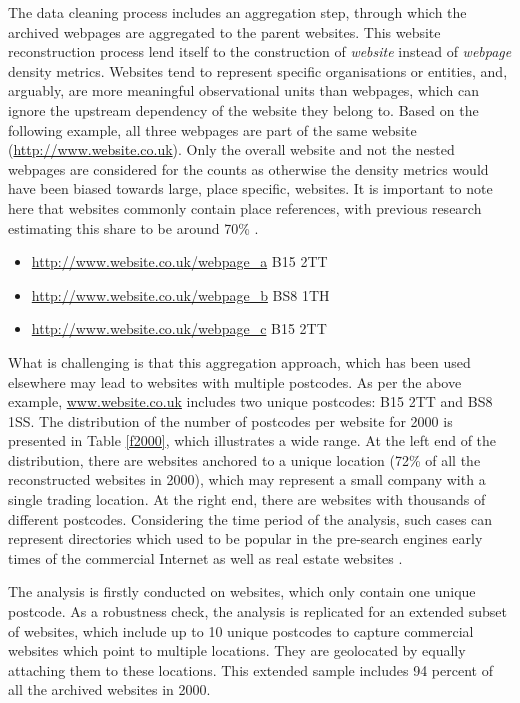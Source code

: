 \documentclass[
  authoryear,
  preprint,
  3p]{elsarticle}
\begin{document}
The data cleaning process includes an aggregation step, through which
the archived webpages are aggregated to the parent websites. This
website reconstruction process lend itself to the construction of
\emph{website} instead of \emph{webpage} density metrics. Websites tend
to represent specific organisations or entities, and, arguably, are more
meaningful observational units than webpages, which can ignore the
upstream dependency of the website they belong to. Based on the
following example, all three webpages are part of the same website
(\url{http://www.website.co.uk}). Only the overall website and not the
nested webpages are considered for the counts as otherwise the density
metrics would have been biased towards large, place specific, websites.
It is important to note here that websites commonly contain place
references, with previous research estimating this share to be around
70\% \citep{hill2009georeferencing}.

\begin{itemize}
\item
  \url{http://www.website.co.uk/webpage_a} B15 2TT
\item
  \url{http://www.website.co.uk/webpage_b} BS8 1TH
\item
  \url{http://www.website.co.uk/webpage_c} B15 2TT
\end{itemize}

\noindent What is challenging is that this aggregation approach, which
has been used elsewhere \citep{tranosuk, shoreditch} may lead to
websites with multiple postcodes. As per the above example,
\href{http://www.website.co.uk}{www.website.co.uk} includes two unique
postcodes: B15 2TT and BS8 1SS. The distribution of the number of
postcodes per website for 2000 is presented in Table \ref{f2000}, which
illustrates a wide range. At the left end of the distribution, there are
websites anchored to a unique location (72\% of all the reconstructed
websites in 2000), which may represent a small company with a single
trading location. At the right end, there are websites with thousands of
different postcodes. Considering the time period of the analysis, such
cases can represent directories which used to be popular in the
pre-search engines early times of the commercial Internet as well as
real estate websites \citep{tranosuk}.

The analysis is firstly conducted on websites, which only contain one
unique postcode. As a robustness check, the analysis is replicated for
an extended subset of websites, which include up to 10 unique postcodes
to capture commercial websites which point to multiple locations. They
are geolocated by equally attaching them to these locations. This
extended sample includes 94 percent of all the archived websites in
2000.
\end{document}

